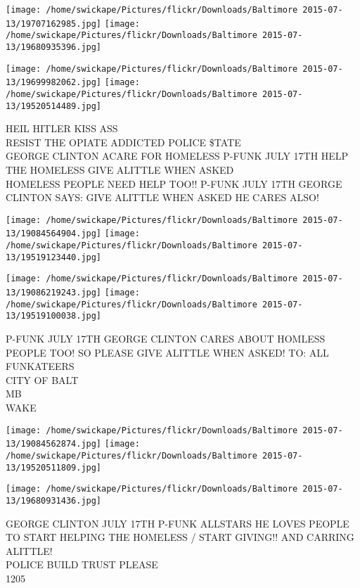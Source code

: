 \documentclass[10pt,letterpaper]{article}
\begin{document}
\texttt{[image: /home/swickape/Pictures/flickr/Downloads/Baltimore 2015-07-13/19707162985.jpg]}
\texttt{[image: /home/swickape/Pictures/flickr/Downloads/Baltimore 2015-07-13/19680935396.jpg]}

\texttt{[image: /home/swickape/Pictures/flickr/Downloads/Baltimore 2015-07-13/19699982062.jpg]}
\texttt{[image: /home/swickape/Pictures/flickr/Downloads/Baltimore 2015-07-13/19520514489.jpg]}

HEIL HITLER KISS ASS\\
RESIST THE OPIATE ADDICTED POLICE \$TATE\\
GEORGE CLINTON ACARE FOR HOMELESS P{-}FUNK JULY 17TH HELP THE HOMELESS GIVE ALITTLE WHEN ASKED\\
HOMELESS PEOPLE NEED HELP TOO!! P{-}FUNK JULY 17TH GEORGE CLINTON SAYS: GIVE ALITTLE WHEN ASKED HE CARES ALSO!\\
\pagebreak

\texttt{[image: /home/swickape/Pictures/flickr/Downloads/Baltimore 2015-07-13/19084564904.jpg]}
\texttt{[image: /home/swickape/Pictures/flickr/Downloads/Baltimore 2015-07-13/19519123440.jpg]}

\texttt{[image: /home/swickape/Pictures/flickr/Downloads/Baltimore 2015-07-13/19086219243.jpg]}
\texttt{[image: /home/swickape/Pictures/flickr/Downloads/Baltimore 2015-07-13/19519100038.jpg]}

P{-}FUNK JULY 17TH GEORGE CLINTON CARES ABOUT HOMLESS PEOPLE TOO!  SO PLEASE GIVE ALITTLE WHEN ASKED!  TO: ALL FUNKATEERS\\
CITY OF BALT\\
MB\\
WAKE\\
\pagebreak

\texttt{[image: /home/swickape/Pictures/flickr/Downloads/Baltimore 2015-07-13/19084562874.jpg]}
\texttt{[image: /home/swickape/Pictures/flickr/Downloads/Baltimore 2015-07-13/19520511809.jpg]}

\texttt{[image: /home/swickape/Pictures/flickr/Downloads/Baltimore 2015-07-13/19680931436.jpg]}

GEORGE CLINTON JULY 17TH P{-}FUNK ALLSTARS HE LOVES PEOPLE TO START HELPING THE HOMELESS / START GIVING!! AND CARRING ALITTLE!\\
POLICE BUILD TRUST PLEASE\\
1205\\
\pagebreak
\end{document}
